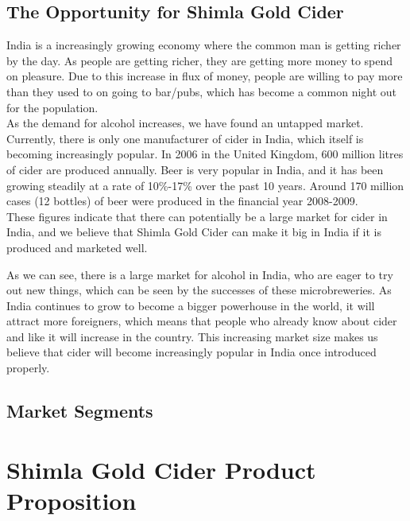 \documentclass[11pt]{article}
\begin{document}
  \subsection{The Opportunity for Shimla Gold Cider}

		India is a increasingly growing economy where the common man is getting
		richer by the day. As people are getting richer, they are getting more
		money to spend on pleasure. Due to this increase in flux of money, people
		are willing to pay more than they used to on going to bar/pubs, which 
		has become a common night out for the population. \\
		As the demand for alcohol increases, we have found an untapped market.
		Currently, there is only one manufacturer of cider in India, which itself
		is becoming increasingly popular. In 2006 in the United Kingdom, 600 million 
		litres of cider are produced annually. Beer is very popular in India, and
		it has been growing steadily at a rate of 10\%-17\% over the past 10 years.
		Around 170 million cases (12 bottles) of beer were produced in the financial
		year 2008-2009. \\
		These figures indicate that there can potentially be a large market for
		cider in India, and we believe that Shimla Gold Cider can make it big in
		India if it is produced and marketed well.

As we can see, there is a large market for alcohol in India, who are eager to try out new things, which can be seen by the successes of these microbreweries. As India continues to grow to become a bigger powerhouse in the world, it will attract more foreigners, which means that people who already know about cider and like it will increase in the country. This increasing market size makes us believe that cider will become increasingly popular in India once introduced properly.
 
  \subsection{Market Segments}

\newpage
\section{Shimla Gold Cider Product Proposition}
\end{document}
